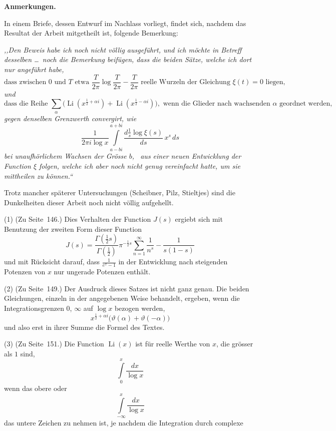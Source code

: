 \documentclass[12pt,a4paper]{article}
\DeclareMathOperator{\Li}{Li}
\begin{document}
\bigskip
\noindent\textbf{Anmerkungen.}

\smallskip
\noindent In einem Briefe, dessen Entwurf im Nachlass vorliegt, findet sich, nachdem das Resultat der Arbeit mitgetheilt ist, folgende Bemerkung:

\smallskip
\noindent\textit{,,Den Beweis habe ich noch nicht v\"ollig ausgef\"uhrt, und ich m\"ochte in Betreff desselben \dots\ noch die Bemerkung beif\"ugen, dass die beiden S\"atze, welche ich dort nur angef\"uhrt habe,
\[
\text{dass zwischen }0\text{ und }T\text{ etwa }\frac{T}{2\pi}\log\frac{T}{2\pi}-\frac{T}{2\pi}\text{ reelle Wurzeln der Gleichung }\xi(t) = 0\text{ liegen,}
\]
und
\[
\text{dass die Reihe }\sum_{\alpha}\bigl(\Li(x^{\frac{1}{2}+\alpha i}) + \Li(x^{\frac{1}{2}-\alpha i})\bigr),\text{ wenn die Glieder nach wachsenden }\alpha\text{ geordnet werden,}
\]
gegen denselben Grenzwerth convergirt, wie
\[
\frac{1}{2\pi i\log x}\int\limits_{a-bi}^{a+bi}\frac{d\frac{1}{s}\log\xi(s)}{ds}\,x^{s}\,ds
\]
bei unaufh\"orlichem Wachsen der Gr\"osse $b$,
\ aus einer neuen Entwicklung der Function $\xi$ folgen, welche ich aber noch nicht genug vereinfacht hatte, um sie mittheilen zu k\"onnen.``}

\smallskip
\noindent Trotz mancher sp\"aterer Untersuchungen (Scheibner, Pilz, Stieltjes) sind die Dunkelheiten dieser Arbeit noch nicht v\"ollig aufgehellt.

\smallskip
\noindent (1) (Zu Seite~146.) Dies Verhalten der Function $J(s)$ ergiebt sich mit Benutzung der zweiten Form dieser Function
\[
J(s) = \frac{\Gamma(\tfrac{1}{2}s)}{\Gamma(\tfrac{1}{2})}\pi^{-\frac{1}{2}s}\sum_{n=1}^{\infty}\frac{1}{n^{s}} - \frac{1}{s(1-s)}
\]
und mit R\"ucksicht darauf, dass $\frac{1}{e^{x}-1}$ in der Entwicklung nach steigenden Potenzen von $x$ nur ungerade Potenzen enth\"alt.

\smallskip
\noindent (2) (Zu Seite~149.) Der Ausdruck dieses Satzes ist nicht ganz genau. Die beiden Gleichungen, einzeln in der angegebenen Weise behandelt, ergeben, wenn die Integrationsgrenzen $0$, $\infty$ auf $\log x$ bezogen werden,
\[
x^{\frac{1}{2}+\alpha i}\bigl(\vartheta(\alpha) + \vartheta(-\alpha)\bigr)
\]
und also erst in ihrer Summe die Formel des Textes.

\smallskip
\noindent (3) (Zu Seite~151.) Die Function $\Li(x)$ ist f\"ur reelle Werthe von $x$, die gr\"osser als $1$ sind,
\[
\int\limits_{0}^{x}\frac{dx}{\log x}
\]
 wenn das obere oder
\[
\int\limits_{-\infty}^{x}\frac{dx}{\log x}
\]
 das untere Zeichen zu nehmen ist, je nachdem die Integration durch complexe
\end{document}
